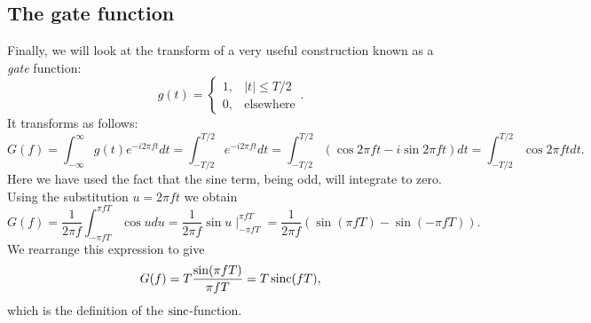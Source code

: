 \subsection{The gate function}
Finally, we will look at the transform of a very useful construction known as a
\emph{gate} function:
\begin{equation}
g(t)=\left \{\begin{array} {cl} 1, & |t| \leq T/2\\
0, & \mbox{elsewhere}
\end{array} \right..
\end{equation}
It transforms as follows:
$$
G(f)=\int^\infty_{-\infty} g(t) e^{-i 2\pi f t} dt = \int^{T/2}_{-T/2} e^{-i 2 \pi f t} dt = \int^{T/2}_{-T/2} (\cos 2\pi f t - i\sin 2\pi f t) dt = \int^{T/2}_{-T/2} \cos 2\pi f t dt.
$$
Here we have used the fact that the sine term, being odd, will integrate to zero. Using the substitution $u = 2 \pi f t$ we obtain
$$
G(f)=\frac{1}{2\pi f} \int^{\pi f T}_{-\pi f T} \cos u du = \frac{1}{2 \pi f}\sin u \mid ^{\pi f T}_{-\pi f T}= \frac {1}{2 \pi f}\left (\sin(\pi f T)-\sin(-\pi f T)\right).
$$
We rearrange this expression to give
\begin{equation}
G(f)= T \frac{\sin(\pi f T)}{\pi f T}= T \operatorname{sinc} (f T),
\end{equation}
which is the definition of the $\operatorname{sinc}$-function.

